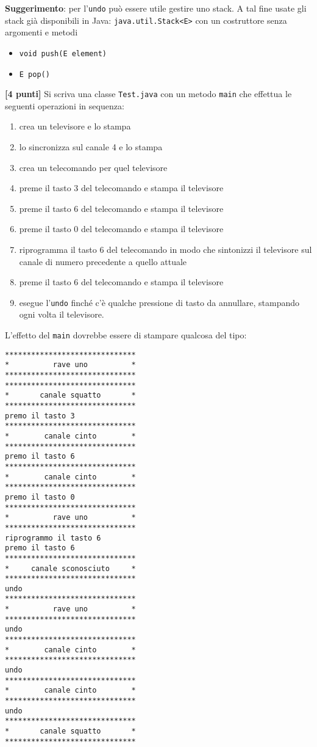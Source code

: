 \documentclass{article}[10pt]
\newcounter{esnu}
\newenvironment{esercizio}{\medskip \noindent {\bf Esercizio\addtocounter{esnu}{1} \arabic{esnu}}}{}
\begin{document}
\begin{esercizio}
\textbf{Suggerimento}: per l'\texttt{undo} pu\`o essere utile gestire uno stack. A tal fine
usate gli stack gi\`a disponibili in Java: \texttt{java.util.Stack<E>} con un costruttore
senza argomenti e metodi
%
\begin{itemize}
\item \texttt{void push(E element)}
\item \texttt{E pop()}
\end{itemize}
%
\end{esercizio}
%
\begin{esercizio}
%
\textbf{[4 punti]} Si scriva una classe \texttt{Test.java} con un metodo \texttt{main} che effettua le seguenti
operazioni in sequenza:
%
\begin{enumerate}
\item crea un televisore e lo stampa
\item lo sincronizza sul canale 4 e lo stampa
\item crea un telecomando per quel televisore
\item preme il tasto 3 del telecomando e stampa il televisore
\item preme il tasto 6 del telecomando e stampa il televisore
\item preme il tasto 0 del telecomando e stampa il televisore
\item riprogramma il tasto 6 del telecomando in modo che sintonizzi il televisore
      sul canale di numero precedente a quello attuale
\item preme il tasto 6 del telecomando e stampa il televisore
\item esegue l'\texttt{undo} finch\'e c'\`e qualche pressione di tasto da annullare, stampando
      ogni volta il televisore.
\end{enumerate}
%
L'effetto del \texttt{main} dovrebbe essere di stampare qualcosa del tipo:
%
{\small\begin{verbatim}
******************************
*          rave uno          *
******************************
******************************
*       canale squatto       *
******************************
premo il tasto 3
******************************
*        canale cinto        *
******************************
premo il tasto 6
******************************
*        canale cinto        *
******************************
premo il tasto 0
******************************
*          rave uno          *
******************************
riprogrammo il tasto 6
premo il tasto 6
******************************
*     canale sconosciuto     *
******************************
undo
******************************
*          rave uno          *
******************************
undo
******************************
*        canale cinto        *
******************************
undo
******************************
*        canale cinto        *
******************************
undo
******************************
*       canale squatto       *
******************************
\end{verbatim}}
%
\end{esercizio}
%
\end{document}
